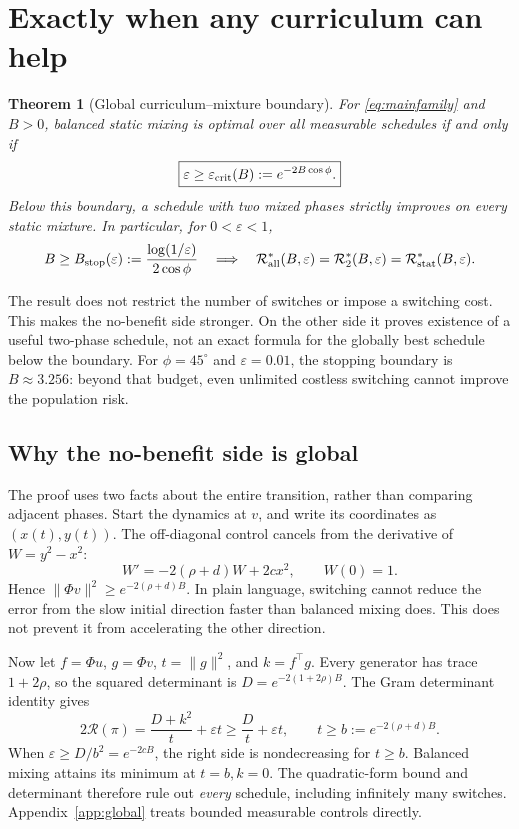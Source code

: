 \documentclass{article}
\newtheorem{theorem}{Theorem}
\theoremstyle{remark}\newtheorem{remark}[theorem]{Remark}
\newcommand{\R}{\mathcal R}
\newcommand{\Rs}{\R_{\mathrm{stat}}^*}
\newcommand{\Rt}{\R_{2}^*}
\newcommand{\Ra}{\R_{\mathrm{all}}^*}
\begin{document}
\section{Exactly when any curriculum can help}\label{sec:boundary}
\begin{theorem}[Global curriculum--mixture boundary]\label{main:boundary}
For \eqref{eq:mainfamily} and $B>0$, balanced static mixing is optimal over all measurable schedules if and only if
\begin{equation}
 \boxed{\varepsilon\ge\varepsilon_{\rm crit}(B):=e^{-2B\cos\phi}.}\label{eq:mainboundary}
\end{equation}
Below this boundary, a schedule with two mixed phases strictly improves on every static mixture. In particular, for $0<\varepsilon<1$,
\begin{equation}
 B\ge B_{\rm stop}(\varepsilon):=\frac{\log(1/\varepsilon)}{2\cos\phi}
 \quad\Longrightarrow\quad\Ra(B,\varepsilon)=\Rt(B,\varepsilon)=\Rs(B,\varepsilon).
\end{equation}
\end{theorem}
The result does not restrict the number of switches or impose a switching cost. This makes the no-benefit side stronger. On the other side it proves existence of a useful two-phase schedule, not an exact formula for the globally best schedule below the boundary. For $\phi=45^\circ$ and $\varepsilon=0.01$, the stopping boundary is $B\approx3.256$: beyond that budget, even unlimited costless switching cannot improve the population risk.

\subsection{Why the no-benefit side is global}
The proof uses two facts about the entire transition, rather than comparing adjacent phases. Start the dynamics at $v$, and write its coordinates as $(x(t),y(t))$. The off-diagonal control cancels from the derivative of $W=y^2-x^2$:
\begin{equation}
 W'=-2(\rho+d)W+2c x^2,\qquad W(0)=1.
\end{equation}
Hence $\|\Phi v\|^2\ge e^{-2(\rho+d)B}$. In plain language, switching cannot reduce the error from the slow initial direction faster than balanced mixing does. This does not prevent it from accelerating the other direction.

Now let $f=\Phi u$, $g=\Phi v$, $t=\|g\|^2$, and $k=f^\top g$. Every generator has trace $1+2\rho$, so the squared determinant is $D=e^{-2(1+2\rho)B}$. The Gram determinant identity gives
\begin{equation}
 2\R(\pi)=\frac{D+k^2}{t}+\varepsilon t
 \ge\frac{D}{t}+\varepsilon t,\qquad t\ge b:=e^{-2(\rho+d)B}.\label{eq:maingram}
\end{equation}
When $\varepsilon\ge D/b^2=e^{-2cB}$, the right side is nondecreasing for $t\ge b$. Balanced mixing attains its minimum at $t=b,k=0$. The quadratic-form bound and determinant therefore rule out \emph{every} schedule, including infinitely many switches. Appendix~\ref{app:global} treats bounded measurable controls directly.
\end{document}
